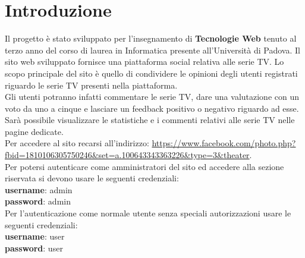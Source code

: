 \newpage
\section{Introduzione}
Il progetto è stato sviluppato per l'insegnamento di \textbf{\normalsize{Tecnologie Web}} tenuto al terzo anno del corso di laurea in Informatica presente all'Università di Padova. Il sito web sviluppato fornisce una piattaforma social relativa alle serie TV. Lo scopo principale del sito è quello di condividere le opinioni degli utenti registrati riguardo le serie TV presenti nella piattaforma.\\
Gli utenti potranno infatti commentare le serie TV, dare una valutazione con un voto da uno a cinque e lasciare un feedback positivo o negativo riguardo ad esse.\\
Sarà possibile visualizzare le statistiche e i commenti relativi alle serie TV nelle pagine dedicate.\\

Per accedere al sito recarsi all'indirizzo: \url{https://www.facebook.com/photo.php?fbid=1810106305750246&set=a.100643343363226&type=3&theater}.~\\

Per potersi autenticare come amministratori del sito ed accedere 
alla sezione riservata si devono usare le seguenti credenziali: \\
\enspace \textbf{username}: admin\\ 
\enspace \textbf{password}: admin \\

Per l'autenticazione come normale utente senza speciali autorizzazioni usare le seguenti credenziali:\\
\enspace \textbf{username}: user\\ 
\enspace \textbf{password}: user \\
